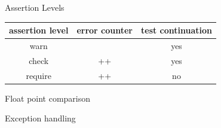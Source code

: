 \documentclass{beamer}
\newcommand{\inlinecpp}[1]{
    \lstinline[language=C++]{#1}
}
\begin{document}
        \begin{frame}{Assertion Levels}
            \begin{tabular}{c|c|c}
                assertion level &   error counter   &   test continuation   \\
                \hline
                warn    &       &   yes  \\
                check   &   ++  &   yes \\
                require &   ++  &   no  \\
            \end{tabular}
        \end{frame}


        \begin{frame}{Float point comparison}
            
        \end{frame}

        \begin{frame}{Exception handling}
                  
        \end{frame}
\end{document}
